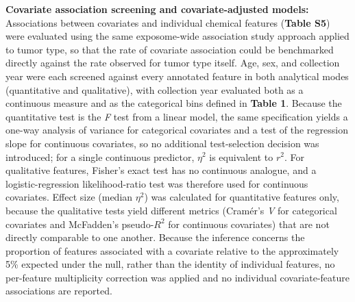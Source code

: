 \newpage



\vspace{0.5em}

\noindent \textbf{Covariate association screening and covariate-adjusted models:} Associations between covariates and individual chemical features (\textbf{Table S5}) were evaluated using the same exposome-wide association study approach applied to tumor type, so that the rate of covariate association could be benchmarked directly against the rate observed for tumor type itself. Age, sex, and collection year were each screened against every annotated feature in both analytical modes (quantitative and qualitative), with collection year evaluated both as a continuous measure and as the categorical bins defined in \textbf{Table 1}. Because the quantitative test is the \textit{F} test from a linear model, the same specification yields a one-way analysis of variance for categorical covariates and a test of the regression slope for continuous covariates, so no additional test-selection decision was introduced; for a single continuous predictor, $\eta^{2}$ is equivalent to $r^{2}$. For qualitative features, Fisher's exact test has no continuous analogue, and a logistic-regression likelihood-ratio test was therefore used for continuous covariates. Effect size (median $\eta^{2}$) was calculated for quantitative features only, because the qualitative tests yield different metrics (Cramér's \textit{V} for categorical covariates and McFadden's pseudo-$R^{2}$ for continuous covariates) that are not directly comparable to one another. Because the inference concerns the proportion of features associated with a covariate relative to the approximately 5\% expected under the null, rather than the identity of individual features, no per-feature multiplicity correction was applied and no individual covariate-feature associations are reported.

\vspace{0.6em}

